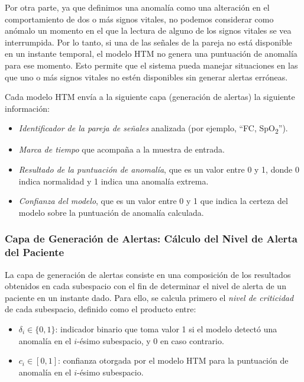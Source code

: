 Por otra parte, ya que definimos una anomalía como una alteración en el comportamiento de dos o más signos vitales, no podemos considerar como anómalo un momento en el que la lectura de alguno de los signos vitales se vea interrumpida. Por lo tanto, si una de las señales de la pareja no está disponible en un instante temporal, el modelo HTM no genera una puntuación de anomalía para ese momento. Esto permite que el sistema pueda manejar situaciones en las que uno o más signos vitales no estén disponibles sin generar alertas erróneas.

Cada modelo HTM envía a la siguiente capa (generación de alertas) la siguiente información:

\begin{itemize}
  \item \emph{Identificador de la pareja de señales} analizada (por ejemplo, “FC, SpO\textsubscript{2}”).
  \item \emph{Marca de tiempo} que acompaña a la muestra de entrada.
  \item \emph{Resultado de la puntuación de anomalía}, que es un valor entre 0 y 1, donde 0 indica normalidad y 1 indica una anomalía extrema.
  \item \emph{Confianza del modelo}, que es un valor entre 0 y 1 que indica la certeza del modelo sobre la puntuación de anomalía calculada.
\end{itemize}

\bigskip

\subsubsection*{Capa de Generación de Alertas: Cálculo del Nivel de Alerta del Paciente}

La capa de generación de alertas consiste en una composición de los resultados obtenidos en cada subespacio con el fin de determinar el nivel de alerta de un paciente en un instante dado. Para ello, se calcula primero el \emph{nivel de criticidad} de cada subespacio, definido como el producto entre:

\begin{itemize}
  \item $\delta_i \in \{0,1\}$: indicador binario que toma valor 1 si el modelo detectó una anomalía en el $i$-ésimo subespacio, y 0 en caso contrario.
  \item $c_i \in [0,1]$: confianza otorgada por el modelo HTM para la puntuación de anomalía en el $i$-ésimo subespacio.
\end{itemize}

